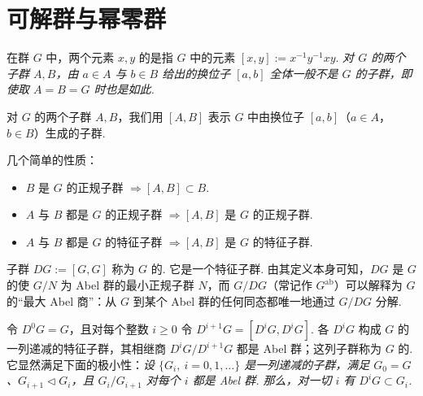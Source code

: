 \section{可解群与幂零群}\label{sec:fg-3-2}

\begin{numpara}[换位子]\label{np:fg-3-2-1}
在群 $G$ 中，两个元素 $x,y$ 的是指 $G$ 中的元素 $[x,y]:=x^{-1}y^{-1}xy$. \emph{对 $G$ 的两个子群 $A,B$，由 $a\in A$ 与 $b\in B$ 给出的换位子 $[a,b]$ 全体一般不是 $G$ 的子群，即使取 $A=B=G$ 时也是如此.}
\end{numpara}

\begin{definition}\label{def:fg-3-2-2}
对 $G$ 的两个子群 $A,B$，我们用 $[A,B]$ 表示 $G$ 中由换位子 $[a,b]$（$a\in A$，$b\in B$）生成的子群.
\end{definition}

几个简单的性质：
\begin{itemize}[label=--]
\item $B$ 是 $G$ 的正规子群 $\Rightarrow[A,B]\subset B$.
\item $A$ 与 $B$ 都是 $G$ 的正规子群 $\Rightarrow[A,B]$ 是 $G$ 的正规子群.
\item $A$ 与 $B$ 都是 $G$ 的特征子群 $\Rightarrow[A,B]$ 是 $G$ 的特征子群.
\end{itemize}

\begin{numpara}[换位子群]\label{np:fg-3-2-3}
子群 $DG:=[G,G]$ 称为 $G$ 的. 它是一个特征子群. 由其定义本身可知，$DG$ 是 $G$ 的使 $G/N$ 为 Abel 群的最小正规子群 $N$，而 $G/DG$（常记作 $G^{\mathrm{ab}}$）可以解释为 $G$ 的``最大 Abel 商''：从 $G$ 到某个 Abel 群的任何同态都唯一地通过 $G/DG$ 分解.
\end{numpara}

\begin{numpara}[导列]\label{np:fg-3-2-4}
令 $D^0G=G$，且对每个整数 $i\geqslant0$ 令 $D^{i+1}G=[D^iG,D^iG]$. 各 $D^iG$ 构成 $G$ 的一列递减的特征子群，其相继商 $D^iG/D^{i+1}G$ 都是 Abel 群；这列子群称为 $G$ 的. 它显然满足下面的极小性：\emph{设 $\{G_i,\ i=0,1,\dots\}$ 是一列递减的子群，满足 $G_0=G$、$G_{i+1}\triangleleft G_i$，且 $G_i/G_{i+1}$ 对每个 $i$ 都是 Abel 群. 那么，对一切 $i$ 有 $D^iG\subset G_i$.}
\end{numpara}

